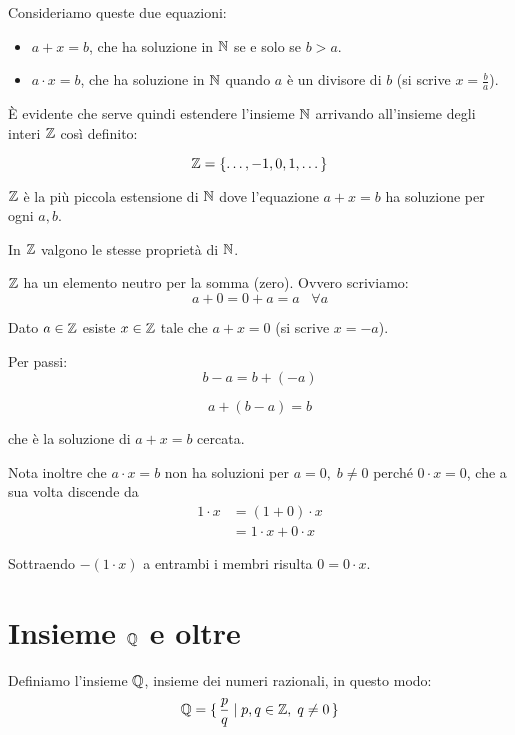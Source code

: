 Consideriamo queste due equazioni:
\begin{itemize}
\item $a+x=b$, che ha soluzione in $\mathbb N$ se e solo se $b > a$.
\item $a \cdot x = b$, che ha soluzione in $\mathbb N$ quando $a$ è un divisore di $b$ (si scrive $x = \frac{b}{a}$).
\end{itemize}

È evidente che serve quindi estendere l'insieme $\mathbb N$ arrivando all'insieme degli interi $\mathbb Z$ così definito:

\begin{equation*}
\mathbb Z = \{\dots, -1, 0, 1, \dots \}
\end{equation*}

$\mathbb Z$ è la più piccola estensione di $\mathbb N$ dove l'equazione $a+x=b$ ha soluzione per ogni $a, b$. 

In $\mathbb Z$ valgono le stesse proprietà di $\mathbb N$.

$\mathbb Z$ ha un elemento neutro per la somma (zero). Ovvero scriviamo:
\begin{equation*}
a + 0 = 0 + a = a \;\;\; \forall a
\end{equation*}

Dato $a \in \mathbb Z$ esiste $x \in \mathbb Z$ tale che $a+x=0$ (si scrive $x=-a$).

Per passi:
\begin{equation*}
b - a = b + (-a)
\end{equation*}


\begin{equation*}
a + (b-a) = b
\end{equation*}

che è la soluzione di $a+x=b$ cercata.

Nota inoltre che $a \cdot x = b$ non ha soluzioni per $a=0,\;b\neq 0$ perché $0 \cdot x = 0$, che a sua volta discende da
\begin{align*}
1 \cdot x &= (1 + 0) \cdot x \\
&=1 \cdot x + 0 \cdot x
\end{align*}

Sottraendo $-(1 \cdot x)$ a entrambi i membri risulta $0 = 0 \cdot x$.

\section{Insieme $\mathbb Q$ e oltre}

Definiamo l'insieme $\mathbb Q$, insieme dei numeri razionali, in questo modo:
\begin{equation*}
\mathbb Q = \set{\frac{p}{q} | p,q \in \mathbb Z,\;q \neq 0}
\end{equation*}

